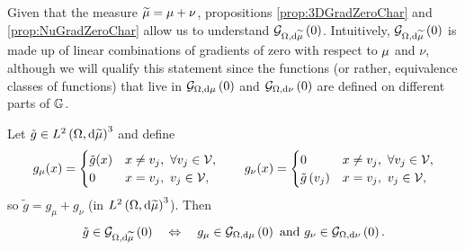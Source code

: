Given that the measure $\widetilde{\mu} = \mu + \nu$, propositions \ref{prop:3DGradZeroChar} and \ref{prop:NuGradZeroChar} allow us to understand $\mathcal{G}_{ \Omega, \mathrm{d}\widetilde{\mu}}\left( 0 \right)$.
Intuitively, $\mathcal{G}_{ \Omega, \mathrm{d}\widetilde{\mu}}\left( 0 \right)$ is made up of linear combinations of gradients of zero with respect to $\mu$ and $\nu$, although we will qualify this statement since the functions (or rather, equivalence classes of functions) that live in $\mathcal{G}_{ \Omega, \mathrm{d}\mu}\left( 0 \right)$ and $\mathcal{G}_{ \Omega, \mathrm{d}\nu}\left( 0 \right)$ are defined on different parts of $\mathbb{G}$.
\begin{theorem} \label{thm:3DdddmesCharGradZero}
	Let $\tilde{g}\in L^{2}\left( \Omega,\mathrm{d}\widetilde{\mu} \right)^3$ and define
	\begin{align*}
		g_\mu(x) = \begin{cases} \tilde{g}(x) & x\neq v_j, \ \forall v_j\in\mathcal{V}, \\ 0 & x=v_j, \ v_j\in\mathcal{V}, \end{cases}
		\qquad
		g_\nu(x) = \begin{cases} 0 & x\neq v_j, \ \forall v_j\in\mathcal{V}, \\ \tilde{g}\left( v_j \right) & x=v_j, \ v_j\in\mathcal{V}, \end{cases}
	\end{align*}
	so $\tilde{g} = g_\mu + g_\nu$ (in $L^{2}\left( \Omega,\mathrm{d}\widetilde{\mu} \right)^3$).
	Then
	\begin{align*}
		\tilde{g}\in\mathcal{G}_{ \Omega, \mathrm{d}\widetilde{\mu}}\left( 0 \right) \quad\Leftrightarrow\quad
		g_\mu\in\mathcal{G}_{ \Omega, \mathrm{d}\mu}\left( 0 \right) \text{ and } g_\nu\in\mathcal{G}_{ \Omega, \mathrm{d}\nu}\left( 0 \right).
	\end{align*}
\end{theorem}
